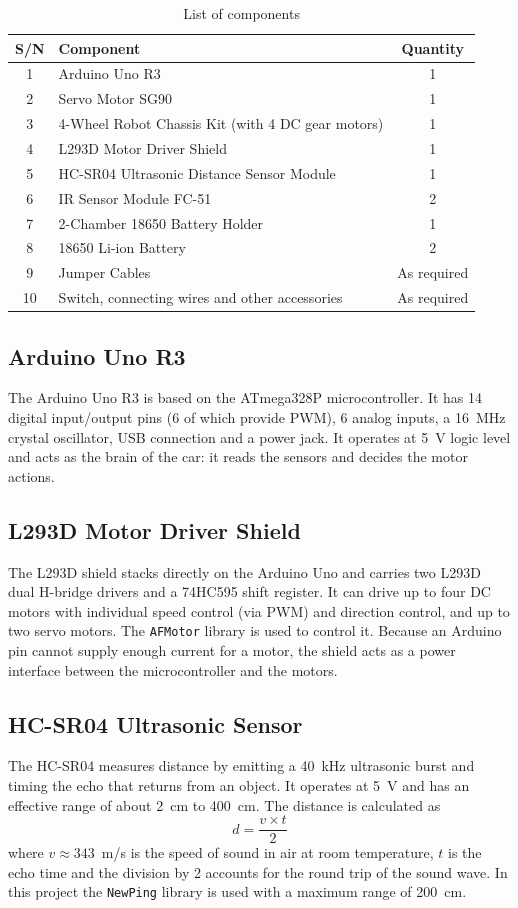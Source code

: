 \documentclass[12pt,a4paper]{article}
\begin{document}
\begin{table}[h]
\centering
\caption{List of components}
\label{tab:components}
\begin{tabular}{@{}clc@{}}
\toprule
\textbf{S/N} & \textbf{Component} & \textbf{Quantity} \\
\midrule
1 & Arduino Uno R3 & 1 \\
2 & Servo Motor SG90 & 1 \\
3 & 4-Wheel Robot Chassis Kit (with 4 DC gear motors) & 1 \\
4 & L293D Motor Driver Shield & 1 \\
5 & HC-SR04 Ultrasonic Distance Sensor Module & 1 \\
6 & IR Sensor Module FC-51 & 2 \\
7 & 2-Chamber 18650 Battery Holder & 1 \\
8 & 18650 Li-ion Battery & 2 \\
9 & Jumper Cables & As required \\
10 & Switch, connecting wires and other accessories & As required \\
\bottomrule
\end{tabular}
\end{table}

\subsection{Arduino Uno R3}
The Arduino Uno R3 is based on the ATmega328P microcontroller. It has 14 digital input/output pins (6 of which provide PWM), 6 analog inputs, a 16~MHz crystal oscillator, USB connection and a power jack. It operates at 5~V logic level and acts as the brain of the car: it reads the sensors and decides the motor actions.

\subsection{L293D Motor Driver Shield}
The L293D shield stacks directly on the Arduino Uno and carries two L293D dual H-bridge drivers and a 74HC595 shift register. It can drive up to four DC motors with individual speed control (via PWM) and direction control, and up to two servo motors. The \texttt{AFMotor} library is used to control it. Because an Arduino pin cannot supply enough current for a motor, the shield acts as a power interface between the microcontroller and the motors.

\subsection{HC-SR04 Ultrasonic Sensor}
The HC-SR04 measures distance by emitting a 40~kHz ultrasonic burst and timing the echo that returns from an object. It operates at 5~V and has an effective range of about 2~cm to 400~cm. The distance is calculated as
\begin{equation}
d = \frac{v \times t}{2}
\end{equation}
where $v \approx 343$~m/s is the speed of sound in air at room temperature, $t$ is the echo time and the division by 2 accounts for the round trip of the sound wave. In this project the \texttt{NewPing} library is used with a maximum range of 200~cm.
\end{document}
